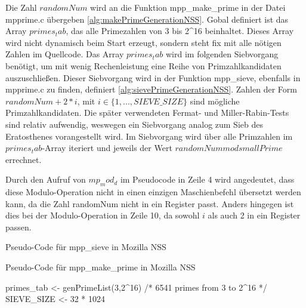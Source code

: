 Die Zahl $randomNum$ wird an die Funktion mpp_make_prime in der Datei mpprime.c übergeben \ref{alg:makePrimeGenerationNSS}.
Gobal definiert ist das Array $primes_tab$, das alle Primezahlen von 3 bis 2^16 beinhaltet. Dieses Array wird nicht dynamisch beim Start erzeugt, sondern steht fix mit alle nötigen Zahlen im Quellcode. 
Das Array $primes_tab$ wird im folgenden Siebvorgang benötigt, um mit wenig Rechenleistung eine Reihe von Primzahlkandidaten auszuschließen.
Dieser Siebvorgang wird in der Funktion mpp_sieve, ebenfalls in mpprime.c zu finden, definiert \ref{alg:sievePrimeGenerationNSS}.
Zahlen der Form $randomNum + 2*i$, mit $i \in \{1,...,SIEVE\_SIZE\}$ sind mögliche Primzahlkandidaten.
Die später verwendeten Fermat- und Miller-Rabin-Tests sind relativ aufwendig, weswegen ein Siebvorgang analog zum Sieb des Eratosthenes vorangestellt wird.
Im Siebvorgang wird über alle Primzahlen im $primes_tab$-Array iteriert und jeweils der Wert $randomNum mod smallPrime$ errechnet. 

Durch den Aufruf von $mp_mod_d$ im Pseudocode in Zeile 4 wird angedeutet, dass diese Modulo-Operation nicht in einen einzigen Maschienbefehl übersetzt werden kann, da die Zahl randomNum nicht in ein Register passt. Anders hingegen ist dies bei der Modulo-Operation in Zeile 10, da sowohl $i$ als auch 2 in ein Register passen.



\begin{algorithm}[h]
\DontPrintSemicolon
\caption{Pseudo-Code für mpp_sieve in Mozilla NSS}
\label{alg:sievePrimeGenerationNSS}
\end{algorithm}

\begin{algorithm}[h]
\DontPrintSemicolon
\caption{Pseudo-Code für mpp_make_prime in Mozilla NSS}
\label{alg:makePrimeGenerationNSS}
primes_tab <- genPrimeList(3,2^16) /* 6541 primes from 3 to 2^16 */\;
SIEVE_SIZE <- 32 * 1024\;

\end{algorithm}



